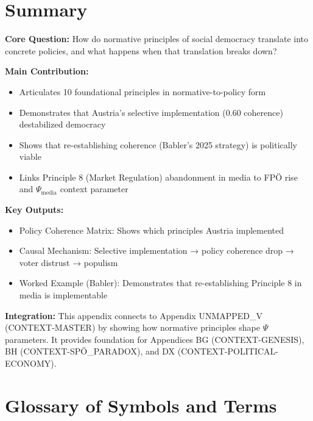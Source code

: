 \section{Summary}
\label{sec:bf-summary}

\begin{tcolorbox}[colback=green!10!white, colframe=green!75!black,
    title=Appendix GEN: Summary]

\textbf{Core Question:} How do normative principles of social democracy translate into concrete policies, and what happens when that translation breaks down?

\textbf{Main Contribution:}
\begin{itemize}[nosep]
    \item Articulates 10 foundational principles in normative-to-policy form
    \item Demonstrates that Austria's selective implementation (0.60 coherence) destabilized democracy
    \item Shows that re-establishing coherence (Babler's 2025 strategy) is politically viable
    \item Links Principle 8 (Market Regulation) abandonment in media to FPÖ rise and $\Psi_{\text{media}}$ context parameter
\end{itemize}

\textbf{Key Outputs:}
\begin{itemize}[nosep]
    \item Policy Coherence Matrix: Shows which principles Austria implemented
    \item Causal Mechanism: Selective implementation → policy coherence drop → voter distrust → populism
    \item Worked Example (Babler): Demonstrates that re-establishing Principle 8 in media is implementable
\end{itemize}

\textbf{Integration:} This appendix connects to Appendix UNMAPPED_V (CONTEXT-MASTER) by showing how normative principles shape $\Psi$ parameters. It provides foundation for Appendices BG (CONTEXT-GENESIS), BH (CONTEXT-SPÖ_PARADOX), and DX (CONTEXT-POLITICAL-ECONOMY).

\end{tcolorbox}


\section{Glossary of Symbols and Terms}
\label{sec:bf-glossary}

